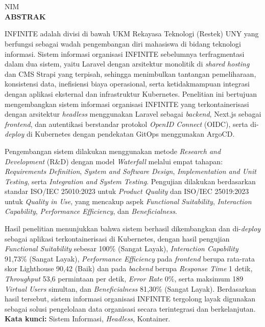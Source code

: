 
\clearpage
{}
{}
\begin{center}
    \textbf{\large{\judulid}}\\[2em]
    \penulis\\
    NIM \nim\\[2em]
    \textbf{ABSTRAK}\\[0.5cm]
\end{center}

INFINITE adalah divisi di bawah UKM Rekayasa Teknologi (Restek) UNY yang berfungsi sebagai wadah pengembangan diri mahasiswa di bidang teknologi informasi. Sistem informasi organisasi INFINITE sebelumnya terfragmentasi dalam dua sistem, yaitu Laravel dengan arsitektur monolitik di \textit{shared hosting} dan CMS Strapi yang terpisah, sehingga menimbulkan tantangan pemeliharaan, konsistensi data, inefisiensi biaya operasional, serta ketidakmampuan integrasi dengan aplikasi eksternal dan infrastruktur Kubernetes. Penelitian ini bertujuan mengembangkan sistem informasi organisasi INFINITE yang terkontainerisasi dengan arsitektur \textit{headless} menggunakan Laravel sebagai \textit{backend}, Next.js sebagai \textit{frontend}, dan autentikasi berstandar protokol \textit{OpenID Connect} (OIDC), serta di-\textit{deploy} di Kubernetes dengan pendekatan GitOps menggunakan ArgoCD.

Pengembangan sistem dilakukan menggunakan metode \textit{Research and Development} (R\&D) dengan model \textit{Waterfall} melalui empat tahapan: \textit{Requirements Definition}, \textit{System and Software Design}, \textit{Implementation and Unit Testing}, serta \textit{Integration and System Testing}. Pengujian dilakukan berdasarkan standar ISO/IEC 25010:2023 untuk \textit{Product Quality} dan ISO/IEC 25019:2023 untuk \textit{Quality in Use}, yang mencakup aspek \textit{Functional Suitability}, \textit{Interaction Capability}, \textit{Performance Efficiency}, dan \textit{Beneficialness}.

Hasil penelitian menunjukkan bahwa sistem berhasil dikembangkan dan di-\textit{deploy} sebagai aplikasi terkontainerisasi di Kubernetes, dengan hasil pengujian \textit{Functional Suitability} sebesar 100\% (Sangat Layak), \textit{Interaction Capability} 91{,}73\% (Sangat Layak), \textit{Performance Efficiency} pada \textit{frontend} berupa rata-rata skor Lighthouse 90{,}42 (Baik) dan pada \textit{backend} berupa \textit{Response Time} 1 detik, \textit{Throughput} 53{,}6 permintaan per detik, \textit{Error Rate} 0\%, serta maksimum 189 \textit{Virtual Users} simultan, dan \textit{Beneficialness} 81{,}30\% (Sangat Layak). Berdasarkan hasil tersebut, sistem informasi organisasi INFINITE tergolong layak digunakan sebagai solusi pengelolaan data organisasi secara terintegrasi dan berkelanjutan.\\[0.6cm]

\noindent \textbf{Kata kunci:} Sistem Informasi, \textit{Headless}, Kontainer.
